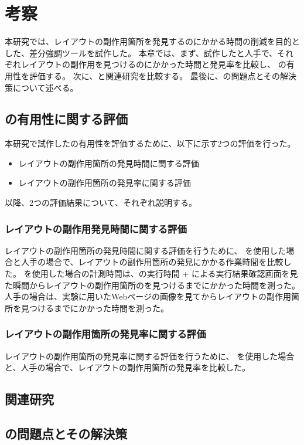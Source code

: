 \chapter{考察}\label{cha:Discussion}
本研究では、レイアウトの副作用箇所を発見するのにかかる時間の削減を目的とした、差分強調ツール\toolName を試作した。
本章では、まず、試作した\toolName と人手で、それぞれレイアウトの副作用を見つけるのにかかった時間と発見率を比較し、
\toolName の有用性を評価する。
次に、\toolName と関連研究を比較する。
最後に、\toolName の問題点とその解決策について述べる。


\section{\toolName の有用性に関する評価}\label{sec:evalue_usefulness}
本研究で試作した\toolName の有用性を評価するために、以下に示す2つの評価を行った。
\begin{itemize}
    \item レイアウトの副作用箇所の発見時間に関する評価
    \item レイアウトの副作用箇所の発見率に関する評価
\end{itemize}
以降、2つの評価結果について、それぞれ説明する。


\subsection{レイアウトの副作用発見時間に関する評価}\label{subsec:evalue_required_time}
レイアウトの副作用箇所の発見時間に関する評価を行うために、
\toolName を使用した場合と人手の場合で、レイアウトの副作用箇所の発見にかかる作業時間を比較した。
\toolName を使用した場合の計測時間は、\toolName の実行時間 + \toolName による実行結果確認画面を見た瞬間からレイアウトの副作用箇所のを見つけるまでにかかった時間を測った。
人手の場合は、実験に用いたWebページの画像を見てからレイアウトの副作用箇所を見つけるまでにかかった時間を測った。

\subsection{レイアウトの副作用箇所の発見率に関する評価}\label{subsec:evalue_accuracy}
レイアウトの副作用箇所の発見率に関する評価を行うために、
\toolName を使用した場合と、人手の場合で、レイアウトの副作用箇所の発見率を比較した。



\section{関連研究}\label{sec:relation_research}



\section{\toolName の問題点とその解決策}\label{sec:AWSEL_problems}